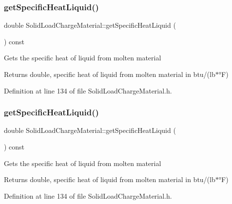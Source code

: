 \subsubsection{\texorpdfstring{get\+Specific\+Heat\+Liquid()}{getSpecificHeatLiquid()}\hspace{0.1cm}{\footnotesize\ttfamily [1/3]}}
{\footnotesize\ttfamily double Solid\+Load\+Charge\+Material\+::get\+Specific\+Heat\+Liquid (\begin{DoxyParamCaption}{ }\end{DoxyParamCaption}) const\hspace{0.3cm}{\ttfamily [inline]}}

Gets the specific heat of liquid from molten material \begin{DoxyReturn}{Returns}
double, specific heat of liquid from molten material in btu/(lb$\ast$°F) 
\end{DoxyReturn}


Definition at line 134 of file Solid\+Load\+Charge\+Material.\+h.

\mbox{\label{class_solid_load_charge_material_a8b02308194b603276df3a894c401e923}} 
\subsubsection{\texorpdfstring{get\+Specific\+Heat\+Liquid()}{getSpecificHeatLiquid()}\hspace{0.1cm}{\footnotesize\ttfamily [2/3]}}
{\footnotesize\ttfamily double Solid\+Load\+Charge\+Material\+::get\+Specific\+Heat\+Liquid (\begin{DoxyParamCaption}{ }\end{DoxyParamCaption}) const\hspace{0.3cm}{\ttfamily [inline]}}

Gets the specific heat of liquid from molten material \begin{DoxyReturn}{Returns}
double, specific heat of liquid from molten material in btu/(lb$\ast$°F) 
\end{DoxyReturn}


Definition at line 134 of file Solid\+Load\+Charge\+Material.\+h.

\mbox{\label{class_solid_load_charge_material_a8b02308194b603276df3a894c401e923}} 
